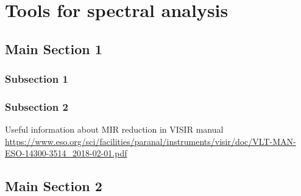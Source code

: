 %


\chapter{Tools for spectral analysis}  %
\label{cha:reduction} 


\section{Main Section 1}



\subsection{Subsection 1}



\subsection{Subsection 2}
Useful information about MIR reduction in VISIR manual
\href{https://www.eso.org/sci/facilities/paranal/instruments/visir/doc/VLT-MAN-ESO-14300-3514_2018-02-01.pdf}{https://www.eso.org/sci/facilities/paranal/instruments/visir/doc/VLT-MAN-ESO-14300-3514_2018-02-01.pdf}

\section{Main Section 2}



